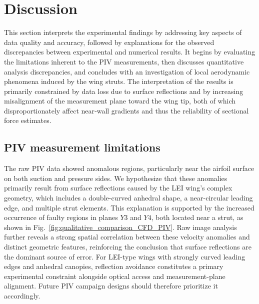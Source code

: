 \documentclass[wes, manuscript]{copernicus}
\begin{document}
\section{Discussion}\label{sec:discussion}
%
This section interprets the experimental findings by addressing key aspects of data quality and accuracy, followed by explanations for the observed discrepancies between experimental and numerical results. 
It begins by evaluating the limitations inherent to the PIV measurements, then discusses quantitative analysis discrepancies, and concludes with an investigation of local aerodynamic phenomena induced by the wing struts. 
The interpretation of the results is primarily constrained by data loss due to surface reflections and by increasing misalignment of the measurement plane toward the wing tip, both of which disproportionately affect near‑wall gradients and thus the reliability of sectional force estimates.
%
\subsection{PIV measurement limitations}
%
The raw PIV data showed anomalous regions, particularly near the airfoil surface on both suction and pressure sides. We hypothesize that these anomalies primarily result from surface reflections caused by the LEI wing’s complex geometry, which includes a double-curved anhedral shape, a near-circular leading edge, and multiple strut elements. This explanation is supported by the increased occurrence of faulty regions in planes $Y3$ and $Y4$, both located near a strut, as shown in Fig.~\ref{fig:qualitative_comparison_CFD_PIV}. Raw image analysis further reveals a strong spatial correlation between these velocity anomalies and distinct geometric features, reinforcing the conclusion that surface reflections are the dominant source of error. 
For LEI-type wings with strongly curved leading edges and anhedral canopies, reflection avoidance constitutes a primary experimental constraint alongside optical access and measurement-plane alignment. Future PIV campaign designs should therefore prioritize it accordingly.
\end{document}
